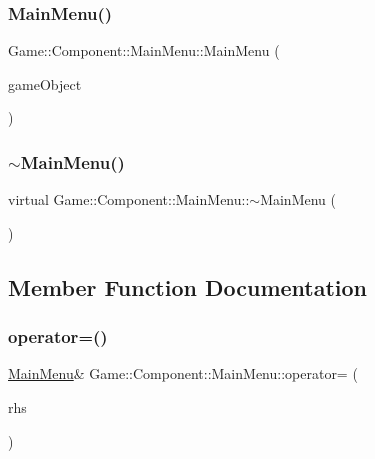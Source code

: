 \subsubsection{\texorpdfstring{Main\+Menu()}{MainMenu()}}
{\footnotesize\ttfamily Game\+::\+Component\+::\+Main\+Menu\+::\+Main\+Menu (\begin{DoxyParamCaption}\item[{\mbox{\hyperlink{class_beer_engine_1_1_game_object}{Beer\+Engine\+::\+Game\+Object}} $\ast$}]{game\+Object }\end{DoxyParamCaption})}

\mbox{\label{class_game_1_1_component_1_1_main_menu_a5a631866a68545d0a825453517d5e1c1}} 
\subsubsection{\texorpdfstring{$\sim$\+Main\+Menu()}{~MainMenu()}}
{\footnotesize\ttfamily virtual Game\+::\+Component\+::\+Main\+Menu\+::$\sim$\+Main\+Menu (\begin{DoxyParamCaption}\item[{void}]{ }\end{DoxyParamCaption})\hspace{0.3cm}{\ttfamily [virtual]}}



\subsection{Member Function Documentation}
\mbox{\label{class_game_1_1_component_1_1_main_menu_ad8a5f072da38a95bdda3f9747cf6e1fa}} 
\subsubsection{\texorpdfstring{operator=()}{operator=()}}
{\footnotesize\ttfamily \mbox{\hyperlink{class_game_1_1_component_1_1_main_menu}{Main\+Menu}}\& Game\+::\+Component\+::\+Main\+Menu\+::operator= (\begin{DoxyParamCaption}\item[{\mbox{\hyperlink{class_game_1_1_component_1_1_main_menu}{Main\+Menu}} const \&}]{rhs }\end{DoxyParamCaption})}

